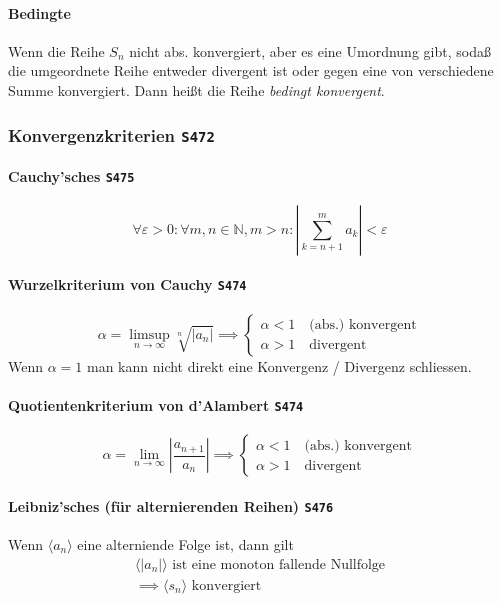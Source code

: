 \documentclass[a4paper, twocolumn]{article}
\numberwithin{equation}{subsection}
\newcommand{\brpage}[1]{\textcolor{red!70!black}{\small\texttt{S#1}}}
\begin{document}
\paragraph{Bedingte} Wenn die Reihe \(S_n\) nicht abs. konvergiert, aber es eine Umordnung gibt, soda{\ss} die umgeordnete Reihe entweder divergent ist oder gegen eine von verschiedene Summe konvergiert. Dann hei{\ss}t die Reihe \emph{bedingt konvergent}.


\subsubsection{Konvergenzkriterien \brpage{472}}

\paragraph{Cauchy'sches \brpage{475}}
\[
    \forall \varepsilon > 0 : \forall m,n \in \mathbb{N}, m > n:
    \left| \sum_{k=n+1}^m a_k \right| < \varepsilon
\]

\paragraph{Wurzelkriterium von Cauchy \brpage{474}}
\[
    \alpha = \limsup_{n\to\infty} \sqrt[n]{\left| a_n \right|}
    \implies\begin{cases}
        \alpha < 1 \quad \text{(abs.) konvergent} \\
        \alpha > 1 \quad \text{divergent}
    \end{cases}
\]
Wenn \(\alpha = 1\)  man kann nicht direkt eine Konvergenz / Divergenz schliessen.

\paragraph{Quotientenkriterium von d'Alambert \brpage{474}}
\[
    \alpha = \lim_{n\to\infty} \left|\frac{a_{n+1}}{a_n}\right|
    \implies\begin{cases}
        \alpha < 1 \quad \text{(abs.) konvergent} \\
        \alpha > 1 \quad \text{divergent}
    \end{cases}
\]

\paragraph{Leibniz'sches (f\"ur alternierenden Reihen) \brpage{476}}
Wenn \(\langle a_n \rangle\) eine alterniende Folge ist, dann gilt
\begin{gather*}
    \langle |a_n| \rangle \text{ ist eine monoton fallende Nullfolge} \\
    \implies \langle s_n \rangle \text{ konvergiert}
\end{gather*}
\end{document}
